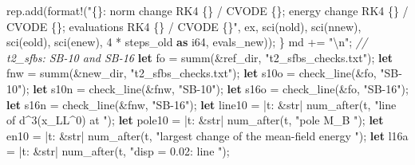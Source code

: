 \documentclass[
  10pt,
]{article}
\newenvironment{Shaded}{}{}
\newcommand{\CommentTok}[1]{\textcolor[rgb]{0.38,0.63,0.69}{\textit{#1}}}
\newcommand{\DataTypeTok}[1]{\textcolor[rgb]{0.56,0.13,0.00}{#1}}
\newcommand{\DecValTok}[1]{\textcolor[rgb]{0.25,0.63,0.44}{#1}}
\newcommand{\KeywordTok}[1]{\textcolor[rgb]{0.00,0.44,0.13}{\textbf{#1}}}
\newcommand{\NormalTok}[1]{#1}
\newcommand{\OperatorTok}[1]{\textcolor[rgb]{0.40,0.40,0.40}{#1}}
\newcommand{\PreprocessorTok}[1]{\textcolor[rgb]{0.74,0.48,0.00}{#1}}
\newcommand{\SpecialCharTok}[1]{\textcolor[rgb]{0.25,0.44,0.63}{#1}}
\newcommand{\StringTok}[1]{\textcolor[rgb]{0.25,0.44,0.63}{#1}}
\begin{document}
\begin{Shaded}
\begin{Highlighting}[]
\NormalTok{        rep}\OperatorTok{.}\NormalTok{add(}\PreprocessorTok{format!}\NormalTok{(}\StringTok{"\{\}: norm change RK4 \{\} / CVODE \{\}; energy change RK4 \{\} / CVODE \{\}; evaluations RK4 \{\} / CVODE \{\}"}\OperatorTok{,}\NormalTok{ ex}\OperatorTok{,}\NormalTok{ sci(nold)}\OperatorTok{,}\NormalTok{ sci(nnew)}\OperatorTok{,}\NormalTok{ sci(eold)}\OperatorTok{,}\NormalTok{ sci(enew)}\OperatorTok{,} \DecValTok{4} \OperatorTok{*}\NormalTok{ steps\_old }\KeywordTok{as} \DataTypeTok{i64}\OperatorTok{,}\NormalTok{ evals\_new))}\OperatorTok{;}
    \OperatorTok{\}}
\NormalTok{    md }\OperatorTok{+=} \StringTok{"}\SpecialCharTok{\textbackslash{}n}\StringTok{"}\OperatorTok{;}
    \CommentTok{// t2\_sfbs: SB{-}10 and SB{-}16}
    \KeywordTok{let}\NormalTok{ fo }\OperatorTok{=}\NormalTok{ summ(}\OperatorTok{\&}\NormalTok{ref\_dir}\OperatorTok{,} \StringTok{"t2\_sfbs\_checks.txt"}\NormalTok{)}\OperatorTok{;}
    \KeywordTok{let}\NormalTok{ fnw }\OperatorTok{=}\NormalTok{ summ(}\OperatorTok{\&}\NormalTok{new\_dir}\OperatorTok{,} \StringTok{"t2\_sfbs\_checks.txt"}\NormalTok{)}\OperatorTok{;}
    \KeywordTok{let}\NormalTok{ s10o }\OperatorTok{=}\NormalTok{ check\_line(}\OperatorTok{\&}\NormalTok{fo}\OperatorTok{,} \StringTok{"SB{-}10"}\NormalTok{)}\OperatorTok{;}
    \KeywordTok{let}\NormalTok{ s10n }\OperatorTok{=}\NormalTok{ check\_line(}\OperatorTok{\&}\NormalTok{fnw}\OperatorTok{,} \StringTok{"SB{-}10"}\NormalTok{)}\OperatorTok{;}
    \KeywordTok{let}\NormalTok{ s16o }\OperatorTok{=}\NormalTok{ check\_line(}\OperatorTok{\&}\NormalTok{fo}\OperatorTok{,} \StringTok{"SB{-}16"}\NormalTok{)}\OperatorTok{;}
    \KeywordTok{let}\NormalTok{ s16n }\OperatorTok{=}\NormalTok{ check\_line(}\OperatorTok{\&}\NormalTok{fnw}\OperatorTok{,} \StringTok{"SB{-}16"}\NormalTok{)}\OperatorTok{;}
    \KeywordTok{let}\NormalTok{ line10 }\OperatorTok{=} \OperatorTok{|}\NormalTok{t}\OperatorTok{:} \OperatorTok{\&}\DataTypeTok{str}\OperatorTok{|}\NormalTok{ num\_after(t}\OperatorTok{,} \StringTok{"line of d\^{}3(x\_LL\^{}0) at "}\NormalTok{)}\OperatorTok{;}
    \KeywordTok{let}\NormalTok{ pole10 }\OperatorTok{=} \OperatorTok{|}\NormalTok{t}\OperatorTok{:} \OperatorTok{\&}\DataTypeTok{str}\OperatorTok{|}\NormalTok{ num\_after(t}\OperatorTok{,} \StringTok{"pole M\_B "}\NormalTok{)}\OperatorTok{;}
    \KeywordTok{let}\NormalTok{ en10 }\OperatorTok{=} \OperatorTok{|}\NormalTok{t}\OperatorTok{:} \OperatorTok{\&}\DataTypeTok{str}\OperatorTok{|}\NormalTok{ num\_after(t}\OperatorTok{,} \StringTok{"largest change of the mean{-}field energy "}\NormalTok{)}\OperatorTok{;}
    \KeywordTok{let}\NormalTok{ l16a }\OperatorTok{=} \OperatorTok{|}\NormalTok{t}\OperatorTok{:} \OperatorTok{\&}\DataTypeTok{str}\OperatorTok{|}\NormalTok{ num\_after(t}\OperatorTok{,} \StringTok{"disp = 0.02: line "}\NormalTok{)}\OperatorTok{;}

\end{Highlighting}
\end{Shaded}
\end{document}
